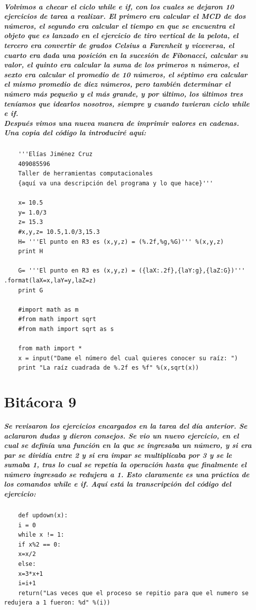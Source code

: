 \documentclass{book}
\begin{document}
	\paragraph{Volvimos a checar el ciclo while e if, con los cuales se dejaron 10 ejercicios de tarea a realizar. El primero era calcular el MCD de dos números, el segundo era calcular el tiempo en que se encuentra el objeto que es lanzado en el ejercicio de tiro vertical de la pelota, el tercero era convertir de grados Celsius a Farenheit y viceversa, el cuarto era dada una posición en la sucesión de Fibonacci, calcular su valor, el quinto era calcular la suma de los primeros n números, el sexto era calcular el promedio de 10 números, el séptimo era calcular el mismo promedio de diez números, pero también determinar el número más pequeño y el más grande, y por último, los últimos tres teníamos que idearlos nosotros, siempre y cuando tuvieran ciclo while e if.\\Después vimos una nueva manera de imprimir valores en cadenas. Una copia del código la introduciré aquí:}
	\begin{verbatim}
	'''Elías Jiménez Cruz
	409085596
	Taller de herramientas computacionales
	{aquí va una descripción del programa y lo que hace}'''
	
	x= 10.5
	y= 1.0/3
	z= 15.3
	#x,y,z= 10.5,1.0/3,15.3
	H= '''El punto en R3 es (x,y,z) = (%.2f,%g,%G)''' %(x,y,z)
	print H
	
	G= '''El punto en R3 es (x,y,z) = ({laX:.2f},{laY:g},{laZ:G})''' .format(laX=x,laY=y,laZ=z)
	print G
	
	#import math as m
	#from math import sqrt
	#from math import sqrt as s
	
	from math import *
	x = input("Dame el número del cual quieres conocer su raíz: ")
	print "La raíz cuadrada de %.2f es %f" %(x,sqrt(x))
	\end{verbatim}
	\chapter{Bitácora 9}
	\paragraph{Se revisaron los ejercicios encargados en la tarea del día anterior. Se aclararon dudas y dieron consejos. Se vio un nuevo ejercicio, en el cual se definía una función en la que se ingresaba un número, y si era par se dividía entre 2 y si era impar se multiplicaba por 3 y se le sumaba 1, tras lo cual se repetía la operación hasta que finalmente el número ingresado se redujera a 1. Esto claramente es una práctica de los comandos while e if. Aquí está la transcripción del código del ejercicio:}
	\begin{verbatim}
	def updown(x):
	i = 0
	while x != 1:
	if x%2 == 0:
	x=x/2
	else:
	x=3*x+1
	i=i+1
	return("Las veces que el proceso se repitio para que el numero se redujera a 1 fueron: %d" %(i))
	\end{verbatim}
\end{document}
